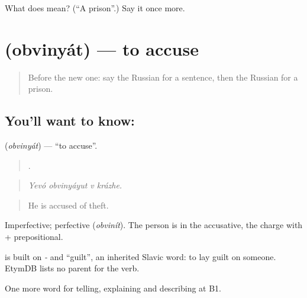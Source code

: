 \begin{tcolorbox}[breakable,colback=teal!4,colframe=teal!35!black,title={Before you move on}]
What does  mean? (\textquotedblleft{}A prison\textquotedblright{}.) Say it once more.
\end{tcolorbox}
\section[\texorpdfstring{\ru{обвинять} (obvinyát)}{обвинять (obvinyát)}]{ (obvinyát) — to accuse}

\label{lesson:RU-C293-obvinyat}



\begin{quote}
Before the new one: say the Russian for a sentence, then the Russian for a prison.
\end{quote}

\subsection*{You'll want to know: }
\textbf{} (\emph{obvinyát}) — \textquotedblleft{}to accuse\textquotedblright{}.

\begin{quote}
   .
\end{quote}

\begin{quote}
\emph{Yevó obvinyáyut v krázhe.}
\end{quote}

\begin{quote}
He is accused of theft.
\end{quote}

Imperfective; perfective \emph{} (\emph{obvinít}). The person is in the accusative, the charge with \emph{} + prepositional.

\begin{cousinweb}
\emph{} is built on \emph{-} and \emph{} \textquotedblleft{}guilt\textquotedblright{}, an inherited Slavic word: to lay guilt on someone. EtymDB lists no parent for the verb.
\end{cousinweb}

\begin{grammarlens}[title={What you've built}]
One more word for telling, explaining and describing at B1.
\end{grammarlens}

